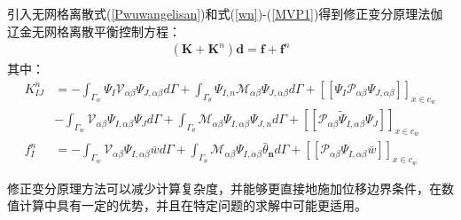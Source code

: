 引入无网格离散式(\ref{Pwuwangelisan})和式(\ref{wn})-(\ref{MVP1})得到修正变分原理法伽辽金无网格离散平衡控制方程：
\begin{equation}
\begin{split}
    (\pmb{K}+\pmb{K}^n)\pmb{d}=\pmb{f}+\pmb{f}^n
\end{split}
\end{equation}
其中：
\begin{equation}
\begin{split}
     K^n_{IJ}&=-\int_{\Gamma_w}\Psi_I\mathcal{V}_{\alpha\beta}\Psi_{J,\alpha\beta}d\Gamma+\int_{\Gamma_{\theta}}\Psi_{I,n}\mathcal{M}_{\alpha\beta}\Psi_{J,\alpha\beta}d\Gamma+[[\Psi_I\mathcal{P}_{\alpha\beta}\Psi_{J,\alpha\beta}]]_{x\in{c_w}}\\
     &-\int_{\Gamma_w}\mathcal{V}_{\alpha\beta}\Psi_{I,\alpha\beta}\Psi_Jd\Gamma+\int_{\Gamma_{\theta}}\mathcal{M}_{\alpha\beta}\Psi_{I,\alpha\beta}\Psi_{J,n}d\Gamma+[[\mathcal{P}_{\alpha\beta}\tilde{\Psi}_{I,\alpha\beta}\Psi_J]]_{x\in{c_w}}\\
     f_{I}^n&=-\int_{\Gamma_w}\mathcal{V}_{\alpha\beta}\Psi_{I,\alpha\beta}\bar{w}d\Gamma+\int_{\Gamma_{\theta}}\mathcal{M}_{\alpha\beta}\Psi_{I,\alpha\beta}\bar{\theta}_{\pmb n}d\Gamma+[[\mathcal{P}_{\alpha\beta}\Psi_{I,\alpha\beta}\bar{w}]]_{x\in{c_w}}
\end{split}
\end{equation}\par
修正变分原理方法可以减少计算复杂度，并能够更直接地施加位移边界条件，在数值计算中具有一定的优势，并且在特定问题的求解中可能更适用。
